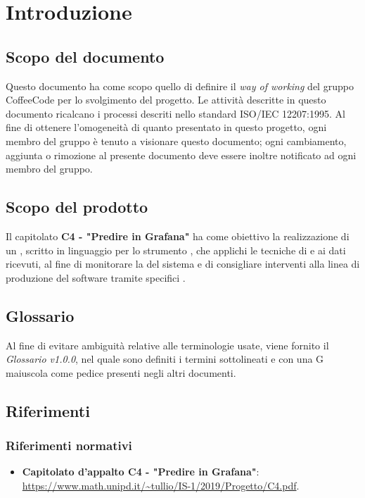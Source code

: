 \documentclass{article}
\begin{document}



\section{Introduzione}%
\label{sec:introduzione}
\subsection{Scopo del documento}
\label{scopo_del_documento}
Questo documento ha come scopo quello di definire il \emph{way of working} del gruppo CoffeeCode per lo svolgimento del progetto.
Le attività descritte in questo documento ricalcano i processi descriti nello standard ISO/IEC 12207:1995. Al fine di ottenere l'omogeneità di quanto presentato in questo progetto, ogni membro del gruppo è tenuto a visionare questo documento; ogni cambiamento, aggiunta o rimozione al presente documento deve essere inoltre notificato ad ogni membro del gruppo.

\subsection{Scopo del prodotto}
\label{scopo_del_prodotto}
Il capitolato \textbf{C4 - "Predire in Grafana"} ha come obiettivo la realizzazione di un , scritto in linguaggio  per lo strumento , che applichi le tecniche di   e  ai dati ricevuti, al fine di monitorare la  del sistema e di consigliare interventi alla linea di produzione del software tramite specifici .

\subsection{Glossario}
\label{glossario}
Al fine di evitare ambiguità relative alle terminologie usate, viene fornito il \textit{Glossario v1.0.0}, nel quale sono definiti i termini sottolineati e con una G maiuscola come pedice presenti negli altri documenti.

\subsection{Riferimenti}
\label{riferimenti}
\subsubsection{Riferimenti normativi}
\begin{itemize}
  \item \textbf{Capitolato d'appalto C4 - "Predire in Grafana"}: \\ \href{https://www.math.unipd.it/~tullio/IS-1/2019/Progetto/C4.pdf}{https://www.math.unipd.it/\textasciitilde tullio/IS-1/2019/Progetto/C4.pdf}.
\end{itemize}
\end{document}
